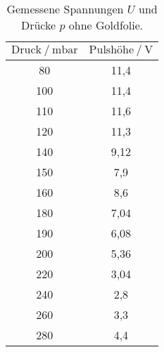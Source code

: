 \begin{table}[H]
   \centering
   \caption{Gemessene Spannungen $U$ und Drücke $p$ ohne Goldfolie.}
   \label{tab:ohne2}
   \begin{tabular} { c c }
 \toprule
 {$\text{Druck}\:/\: \mathrm{mbar}$} & {$\text{Pulshöhe}\:/\: \mathrm{V}$} \\ 
    \midrule
    80 & 11,4 \\
    100 & 11,4 \\
    110 & 11,6 \\
    120 & 11,3 \\
    140 & 9,12 \\
    150 & 7,9 \\
    160 & 8,6 \\
    180 & 7,04 \\
    190 & 6,08 \\
    200 & 5,36 \\
    220 & 3,04 \\
    240 & 2,8 \\
    260 & 3,3 \\
    280 & 4,4 \\
    \bottomrule
  \end{tabular}
\end{table}
